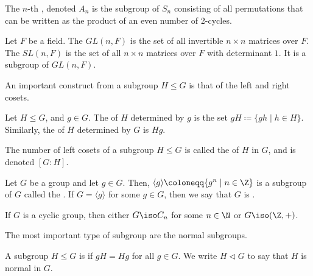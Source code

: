 \documentclass[12pt]{report}
\begin{document}
\begin{example}
  The \(n\)-th , denoted \(A_{n}\) is the subgroup of \(S_{n}\) consisting of all permutations that can be written as the product of an even number of 2-cycles.
\end{example}

\begin{example}
  Let \(F\) be a field.
  The  \(GL(n, F)\) is the set of all invertible \(n \times n\) matrices over \(F\).
  The  \(SL(n, F)\) is the set of all \(n \times n\) matrices over \(F\) with determinant \(1\).
  It is a subgroup of \(GL(n, F)\).
\end{example}


An important construct from a subgroup \(H \leq G\) is that of the left and right cosets.

\begin{definition}\label{def:group-theory:coset}
  Let \(H \leq G\), and \(g \in G\).
  The  of \(H\) determined by \(g\) is the set \(gH \coloneqq \{gh \mid h \in H\}\).
  Similarly, the  of \(H\) determined by \(G\) is \(Hg\).


  The number of left cosets of a subgroup \(H \leq G\) is called the  of \(H\) in \(G\), and is denoted \([G : H]\).
\end{definition}

\begin{example}
  Let \(G\) be a group and let \(g \in G\).
  Then, \(\langle g \rangle \coloneqq \{g^{n} \mid n \in \Z\}\) is a subgroup of \(G\) called the .
  If \(G = \langle g \rangle\) for some \(g \in G\), then we say that \(G\) is .
\end{example}

\begin{lemma}
  If \(G\) is a cyclic group, then either \(G \iso C_{n}\) for some \(n \in \N\) or \(G \iso (\Z, +)\).
\end{lemma}

The most important type of subgroup are the normal subgroups.

\begin{definition}
  A subgroup \(H \leq G\) is  if \(gH = Hg\) for all \(g \in G\).
  We write \(H \triangleleft G\) to say that \(H\) is normal in \(G\).
\end{definition}
\end{document}
